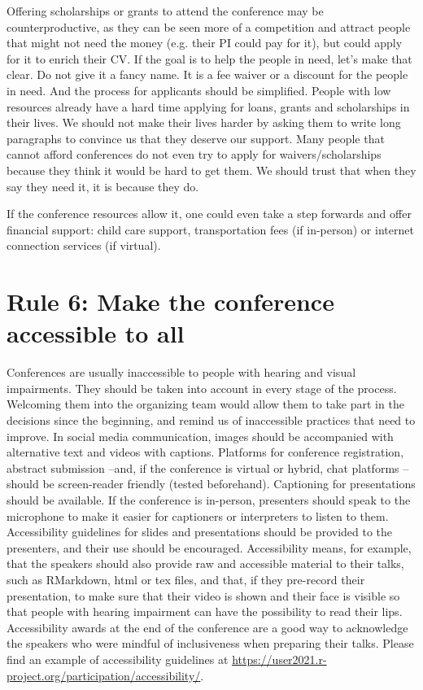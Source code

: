 \documentclass[10pt,letterpaper]{article}
\begin{document}
Offering scholarships or grants to attend the conference may be counterproductive, as they can be seen more of a competition and attract people that might not need the money (e.g. their PI could pay for it), but could apply for it to enrich their CV. If the goal is to help the people in need, let's make that clear. Do not give it a fancy name. It is a fee waiver or a discount for the people in need. And the process for applicants should be simplified. People with low resources already have a hard time applying for loans, grants and scholarships in their lives. We should not make their lives harder by asking them to write long paragraphs to convince us that they deserve our support. Many people that cannot afford conferences do not even try to apply for waivers/scholarships because they think it would be hard to get them. We should trust that when they say they need it, it is because they do.  

If the conference resources allow it, one could even take a step forwards and offer financial support: child care support, transportation fees (if in-person) or internet connection services (if virtual). 

\section*{Rule 6: Make the conference accessible to all}

Conferences are usually inaccessible to people with hearing and visual impairments. They should be taken into account in every stage of the process. Welcoming them into the organizing team would allow them to take part in the decisions since the beginning, and remind us of inaccessible practices that need to improve. In social media communication, images should be accompanied with alternative text and videos with captions. Platforms for conference registration, abstract submission --and, if the conference is virtual or hybrid, chat platforms --should be screen-reader friendly (tested beforehand). Captioning for presentations should be available. If the conference is in-person, presenters should speak to the microphone to make it easier for captioners or interpreters to listen to them. Accessibility guidelines for slides and presentations should be provided to the presenters, and their use should be encouraged. Accessibility means, for example, that the speakers should also provide raw and accessible material to their talks, such as RMarkdown, html or tex files, and that, if they pre-record their presentation, to make sure that their video is shown and their face is visible so that people with hearing impairment can have the possibility to read their lips. Accessibility awards at the end of the conference are a good way to acknowledge the speakers who were mindful of inclusiveness when preparing their talks. Please find an example of accessibility guidelines at \url{https://user2021.r-project.org/participation/accessibility/}.
\end{document}
